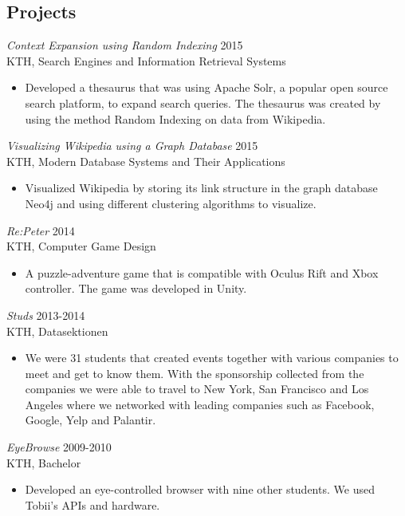 \documentclass[margin, 10pt]{res} %
\begin{document}
\begin{resume}
\section{Projects}

{\sl Context Expansion using Random Indexing} \hfill 2015 \\
KTH, Search Engines and Information Retrieval Systems
\begin{itemize} 
\item Developed a thesaurus that was using Apache Solr, a popular open source search platform, to expand search queries. The thesaurus was created by using the method Random Indexing on data from Wikipedia.
\end{itemize} 

{\sl Visualizing Wikipedia using a Graph Database} \hfill 2015 \\
KTH, Modern Database Systems and Their Applications
\begin{itemize} 
\item Visualized Wikipedia by storing its link structure in the graph database Neo4j and using different clustering algorithms to visualize.
\end{itemize} 

{\sl Re:Peter} \hfill 2014 \\
KTH, Computer Game Design
\begin{itemize} 
\item A puzzle-adventure game that is compatible with Oculus Rift and Xbox controller. The game was developed in Unity.
\end{itemize} 

{\sl Studs} \hfill 2013-2014 \\
KTH, Datasektionen
\begin{itemize} 
\item We were 31 students that created events together with various companies to meet and get to know them. With the sponsorship collected from the companies we were able to travel to New York, San Francisco and Los Angeles where we networked with leading companies such as Facebook, Google, Yelp and Palantir.
\end{itemize} 

{\sl EyeBrowse} \hfill 2009-2010 \\
KTH, Bachelor
\begin{itemize} 
\item Developed an eye-controlled browser with nine other students. We used Tobii’s APIs and hardware.
\end{itemize} 


\end{resume}
\end{document}
